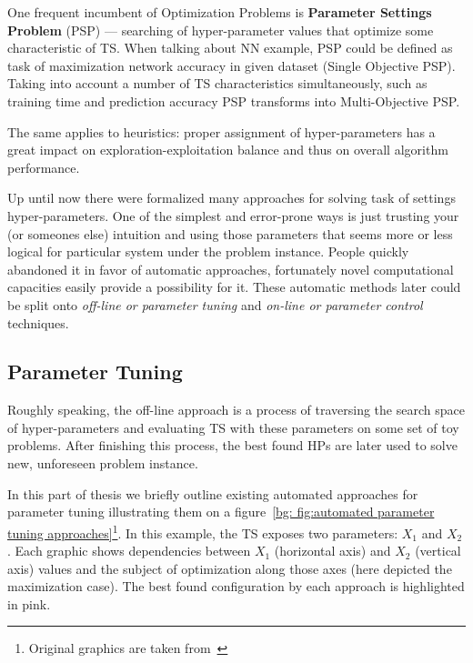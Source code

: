 One frequent incumbent of Optimization Problems is \textbf{Parameter Settings Problem} (PSP) — searching of hyper-parameter values that optimize some characteristic of TS. When talking about NN example, PSP could be defined as task of maximization network accuracy in given dataset (Single Objective PSP). Taking into account a number of TS characteristics simultaneously, such as training time and prediction accuracy PSP transforms into Multi-Objective PSP.

The same applies to heuristics: proper assignment of hyper-parameters has a great impact on exploration-exploitation balance and thus on overall algorithm performance.

Up until now there were formalized many approaches for solving task of settings hyper-parameters. 
One of the simplest and error-prone ways is just trusting your (or someones else) intuition and using those parameters that seems more or less logical for particular system under the problem instance. People quickly abandoned it in favor of automatic approaches, fortunately novel computational capacities easily provide a possibility for it. These automatic methods later could be split onto \textit{off-line or parameter tuning} and \textit{on-line or parameter control} techniques.


\subsection{Parameter Tuning}
Roughly speaking, the off-line approach is a process of traversing the search space of hyper-parameters and evaluating TS with these parameters on some set of toy problems. After finishing this process, the best found HPs are later used to solve new, unforeseen problem instance.

In this part of thesis we briefly outline existing automated approaches for parameter tuning illustrating them on a figure~\ref{bg: fig:automated parameter tuning approaches}\footnote{Original graphics are taken from~\cite{koch2017automated}}. In this example, the TS exposes two parameters: $X_1$ and $X_2$. Each graphic shows dependencies between $X_1$ (horizontal axis) and $X_2$ (vertical axis) values and the subject of optimization along those axes (here depicted the maximization case). The best found configuration by each approach is highlighted in pink.

